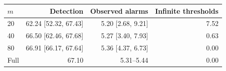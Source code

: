 \begin{tabular}{lrrr}
\toprule
$m$ & Detection & Observed alarms & Infinite thresholds \\
\midrule
20 & 62.24 [52.32, 67.43] & 5.20 [2.68, 9.21] & 7.52 \\
40 & 66.50 [62.46, 67.68] & 5.27 [3.40, 7.93] & 0.63 \\
80 & 66.91 [66.17, 67.64] & 5.36 [4.37, 6.73] & 0.00 \\
Full & 67.10 & 5.31--5.44 & 0.00 \\
\bottomrule
\end{tabular}
